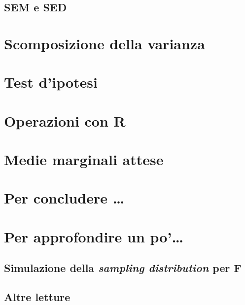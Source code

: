 \documentclass[a4paper,12pt,oneside]{book}
\begin{document}
\hypertarget{sem-e-sed}{%
\subsection{SEM e SED}\label{sem-e-sed}}

\hypertarget{scomposizione-della-varianza}{%
\section{Scomposizione della varianza}\label{scomposizione-della-varianza}}

\hypertarget{test-dipotesi}{%
\section{Test d'ipotesi}\label{test-dipotesi}}

\hypertarget{operazioni-con-r}{%
\section{Operazioni con R}\label{operazioni-con-r}}

\hypertarget{medie-marginali-attese}{%
\section{Medie marginali attese}\label{medie-marginali-attese}}

\hypertarget{per-concludere}{%
\section{Per concludere \ldots{}}\label{per-concludere}}

\hypertarget{per-approfondire-un-po-5}{%
\section{Per approfondire un po'\ldots{}}\label{per-approfondire-un-po-5}}

\hypertarget{simulazione-della-sampling-distribution-per-f}{%
\subsection{\texorpdfstring{Simulazione della \emph{sampling distribution} per F}{Simulazione della sampling distribution per F}}\label{simulazione-della-sampling-distribution-per-f}}

\hypertarget{altre-letture-3}{%
\subsection{Altre letture}\label{altre-letture-3}}
\end{document}
